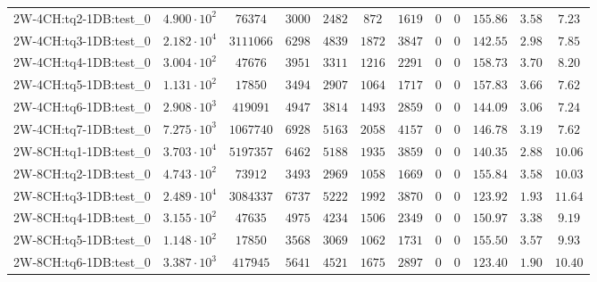 \begin{tabular}{|l|c|c|c|c|c|c|c|c|c|c|c|}
2W-4CH:tq2-1DB:test\_0   & $ 4.900 \cdot 10^{2} $ & $ 76374     $ & $ 3000    $ & $ 2482   $ & $ 872    $ & $ 1619   $ & $ 0 $ & $ 0 $ & $ 155.86      $ & $ 3.58    $ & $ 7.23    $ \\
2W-4CH:tq3-1DB:test\_0   & $ 2.182 \cdot 10^{4} $ & $ 3111066   $ & $ 6298    $ & $ 4839   $ & $ 1872   $ & $ 3847   $ & $ 0 $ & $ 0 $ & $ 142.55      $ & $ 2.98    $ & $ 7.85    $ \\
2W-4CH:tq4-1DB:test\_0   & $ 3.004 \cdot 10^{2} $ & $ 47676     $ & $ 3951    $ & $ 3311   $ & $ 1216   $ & $ 2291   $ & $ 0 $ & $ 0 $ & $ 158.73      $ & $ 3.70    $ & $ 8.20    $ \\
2W-4CH:tq5-1DB:test\_0   & $ 1.131 \cdot 10^{2} $ & $ 17850     $ & $ 3494    $ & $ 2907   $ & $ 1064   $ & $ 1717   $ & $ 0 $ & $ 0 $ & $ 157.83      $ & $ 3.66    $ & $ 7.62    $ \\
2W-4CH:tq6-1DB:test\_0   & $ 2.908 \cdot 10^{3} $ & $ 419091    $ & $ 4947    $ & $ 3814   $ & $ 1493   $ & $ 2859   $ & $ 0 $ & $ 0 $ & $ 144.09      $ & $ 3.06    $ & $ 7.24    $ \\
2W-4CH:tq7-1DB:test\_0   & $ 7.275 \cdot 10^{3} $ & $ 1067740   $ & $ 6928    $ & $ 5163   $ & $ 2058   $ & $ 4157   $ & $ 0 $ & $ 0 $ & $ 146.78      $ & $ 3.19    $ & $ 7.62    $ \\
2W-8CH:tq1-1DB:test\_0   & $ 3.703 \cdot 10^{4} $ & $ 5197357   $ & $ 6462    $ & $ 5188   $ & $ 1935   $ & $ 3859   $ & $ 0 $ & $ 0 $ & $ 140.35      $ & $ 2.88    $ & $ 10.06   $ \\
2W-8CH:tq2-1DB:test\_0   & $ 4.743 \cdot 10^{2} $ & $ 73912     $ & $ 3493    $ & $ 2969   $ & $ 1058   $ & $ 1669   $ & $ 0 $ & $ 0 $ & $ 155.84      $ & $ 3.58    $ & $ 10.03   $ \\
2W-8CH:tq3-1DB:test\_0   & $ 2.489 \cdot 10^{4} $ & $ 3084337   $ & $ 6737    $ & $ 5222   $ & $ 1992   $ & $ 3870   $ & $ 0 $ & $ 0 $ & $ 123.92      $ & $ 1.93    $ & $ 11.64   $ \\
2W-8CH:tq4-1DB:test\_0   & $ 3.155 \cdot 10^{2} $ & $ 47635     $ & $ 4975    $ & $ 4234   $ & $ 1506   $ & $ 2349   $ & $ 0 $ & $ 0 $ & $ 150.97      $ & $ 3.38    $ & $ 9.19    $ \\
2W-8CH:tq5-1DB:test\_0   & $ 1.148 \cdot 10^{2} $ & $ 17850     $ & $ 3568    $ & $ 3069   $ & $ 1062   $ & $ 1731   $ & $ 0 $ & $ 0 $ & $ 155.50      $ & $ 3.57    $ & $ 9.93    $ \\
2W-8CH:tq6-1DB:test\_0   & $ 3.387 \cdot 10^{3} $ & $ 417945    $ & $ 5641    $ & $ 4521   $ & $ 1675   $ & $ 2897   $ & $ 0 $ & $ 0 $ & $ 123.40      $ & $ 1.90    $ & $ 10.40   $ \\

\end{tabular}
